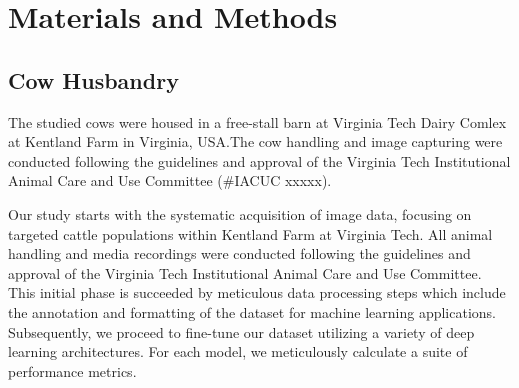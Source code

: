 \section{Materials and Methods}
\subsection*{Cow Husbandry}

The studied cows were housed in a free-stall barn at Virginia Tech Dairy Comlex at Kentland Farm in Virginia, USA.The cow handling and image capturing were conducted following the guidelines and approval of the Virginia Tech Institutional Animal Care and Use Committee (\#IACUC xxxxx).






Our study starts with the systematic acquisition of image data, focusing on targeted cattle populations within Kentland Farm at Virginia Tech. All animal handling and media recordings were conducted following the guidelines and approval of the Virginia Tech Institutional Animal Care and Use Committee. This initial phase is succeeded by meticulous data processing steps which include the annotation and formatting of the dataset for machine learning applications. Subsequently, we proceed to fine-tune our dataset utilizing a variety of deep learning architectures. For each model, we meticulously calculate a suite of performance metrics.


